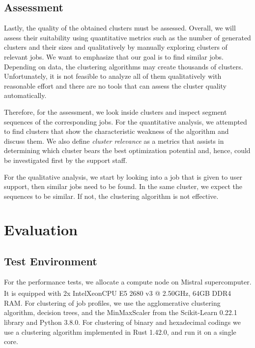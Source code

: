 \documentclass{jhps}
\begin{document}
\subsection{Assessment}
Lastly, the quality of the obtained clusters must be assessed.
Overall, we will assess their suitability using quantitative metrics such as the number of generated clusters and their sizes and qualitatively by manually exploring clusters of relevant jobs.
We want to emphasize that our goal is to find similar jobs.
Depending on data, the clustering algorithms may create thousands of clusters.
Unfortunately, it is not feasible to analyze all of them qualitatively with reasonable effort and there are no tools that can assess the cluster quality automatically.

Therefore, for the assessment, we look inside clusters and inspect segment sequences of the corresponding jobs.
For the quantitative analysis, we attempted to find clusters that show the characteristic weakness of the algorithm and discuss them.
We also define \textit{cluster relevance} as a metrics that assists in determining which cluster bears the best optimization potential and, hence, could be investigated first by the support staff.

For the qualitative analysis, we start by looking into a job that is given to user support, then similar jobs need to be found.
In the same cluster, we expect the sequences to be similar.
If not, the clustering algorithm is not effective.



\section{Evaluation}%
\label{sec:evaluation}

\subsection{Test Environment}%
\label{sec:test_environment}
For the performance tests, we allocate a compute node on Mistral supercomputer.
It is equipped with 2x Intel\textsuperscript\textregistered\@ Xeon\textsuperscript\textregistered\@ CPU E5 2680 v3 @ 2.50GHz, 64GB DDR4 RAM\@.
For clustering of job profiles, we use the agglomerative clustering algorithm, decision trees, and the MinMaxScaler from the Scikit-Learn 0.22.1 library and Python 3.8.0.
For clustering of binary and hexadecimal codings we use a clustering algorithm implemented in Rust 1.42.0, and run it on a single core.
\end{document}
